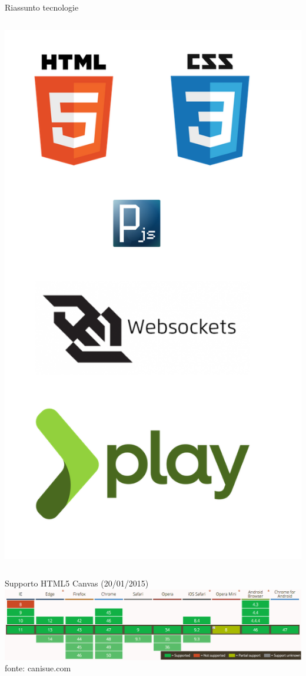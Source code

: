 \begin{frame}{Riassunto tecnologie}
{\begin{columns}
\begin{column}{0.3\textwidth}
				\includegraphics[scale=0.15]{images/technologies.png}
			\end{column}
		\end{columns}
	}
	{
		Supporto HTML5 Canvas (\scriptsize{20/01/2015}\normalsize{)}
		\centering
		\includegraphics[scale=0.25]{images/canvasSupport.png}
		\\
		\vspace{10mm}
		\tiny{fonte: canisue.com}
	}
\end{frame}